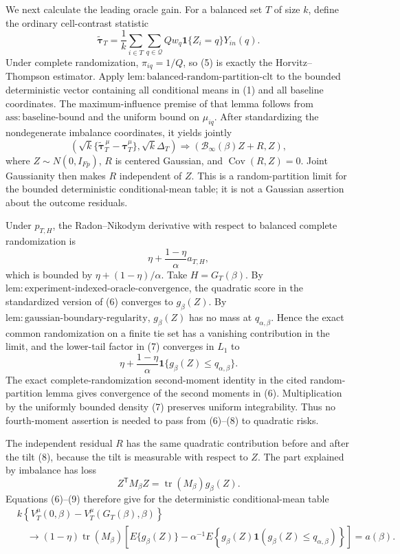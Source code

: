 We next calculate the leading oracle gain.  For a balanced set \(T\) of size \(k\), define the ordinary cell-contrast statistic
\[
\widetilde{\boldsymbol\tau}_T
=\frac{1}{k}\sum_{i\in T}\sum_{q\in\mathcal Q}
Qw_q\mathbf 1\{Z_i=q\}Y_{in}(q).
\tag{5}
\]
Under complete randomization, \(\pi_{iq}=1/Q\), so (5) is exactly the Horvitz--Thompson estimator.  Apply
\(\mathrm{lem{:}balanced\text{-}random\text{-}partition\text{-}clt}\)
to the bounded deterministic vector containing all conditional means in (1) and all baseline coordinates.  The maximum-influence premise of that lemma follows from \(\mathrm{ass{:}baseline\text{-}bound}\) and the uniform bound on \(\mu_{iq}\).  After standardizing the nondegenerate imbalance coordinates, it yields jointly
\[
\left(
\sqrt{k}\{\widetilde{\boldsymbol\tau}^{\,\mu}_T
-\boldsymbol\tau_T^\mu\},
\sqrt{k}\Delta_T
\right)
\Rightarrow
\left(\mathcal B_\infty(\beta)Z+R,Z\right),
\tag{6}
\]
where \(Z\sim N(0,I_{Fp})\), \(R\) is centered Gaussian, and
\(\operatorname{Cov}(R,Z)=0\).  Joint Gaussianity then makes \(R\) independent of \(Z\).  This is a random-partition limit for the bounded deterministic conditional-mean table; it is not a Gaussian assertion about the outcome residuals.

Under \(p_{T,H}\), the Radon--Nikodym derivative with respect to balanced complete randomization is
\[
\eta+\frac{1-\eta}{\alpha}a_{T,H},
\tag{7}
\]
which is bounded by \(\eta+(1-\eta)/\alpha\).  Take \(H=G_T(\beta)\).  By
\(\mathrm{lem{:}experiment\text{-}indexed\text{-}oracle\text{-}convergence}\),
the quadratic score in the standardized version of (6) converges to
\(g_\beta(Z)\).  By
\(\mathrm{lem{:}gaussian\text{-}boundary\text{-}regularity}\),
\(g_\beta(Z)\) has no mass at \(q_{\alpha,\beta}\).  Hence the exact common randomization on a finite tie set has a vanishing contribution in the limit, and the lower-tail factor in (7) converges in \(L_1\) to
\[
\eta+\frac{1-\eta}{\alpha}
\mathbf 1\{g_\beta(Z)\leq q_{\alpha,\beta}\}.
\tag{8}
\]
The exact complete-randomization second-moment identity in the cited random-partition lemma gives convergence of the second moments in (6).  Multiplication by the uniformly bounded density (7) preserves uniform integrability.  Thus no fourth-moment assertion is needed to pass from (6)--(8) to quadratic risks.

The independent residual \(R\) has the same quadratic contribution before and after the tilt (8), because the tilt is measurable with respect to \(Z\).  The part explained by imbalance has loss
\[
Z^{\mathsf T}M_\beta Z
=\operatorname{tr}(M_\beta)g_\beta(Z).
\tag{9}
\]
Equations (6)--(9) therefore give for the deterministic conditional-mean table
\[
\begin{aligned}
&k\left\{
V_T^\mu(0,\beta)-V_T^\mu(G_T(\beta),\beta)
\right\}\\
&\quad\longrightarrow
(1-\eta)\operatorname{tr}(M_\beta)
\left[
E\{g_\beta(Z)\}
-\alpha^{-1}E\!\left\{
g_\beta(Z)\mathbf 1(g_\beta(Z)\leq q_{\alpha,\beta})
\right\}
\right]
=a(\beta).
\end{aligned}
\tag{10}
\]

